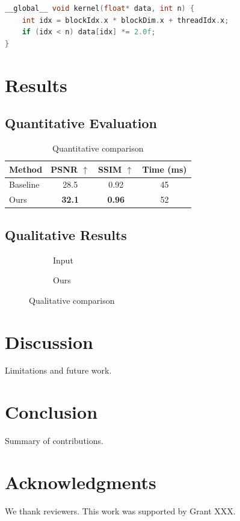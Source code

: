 \documentclass[sigconf,review,anonymous]{acmart}
\begin{document}
\begin{lstlisting}[language=C, caption=CUDA kernel, label=lst:cuda]
__global__ void kernel(float* data, int n) {
    int idx = blockIdx.x * blockDim.x + threadIdx.x;
    if (idx < n) data[idx] *= 2.0f;
}
\end{lstlisting}

\section{Results}
\label{sec:results}

\subsection{Quantitative Evaluation}
\label{sec:quantitative}

\begin{table}[htbp]
\caption{Quantitative comparison}\label{tab:quant}
\begin{tabular}{lccc}
\toprule
Method & PSNR $\uparrow$ & SSIM $\uparrow$ & Time (ms) \\
\midrule
Baseline & 28.5 & 0.92 & 45 \\
Ours & \textbf{32.1} & \textbf{0.96} & 52 \\
\bottomrule
\end{tabular}
\end{table}

\subsection{Qualitative Results}
\label{sec:qualitative}

\begin{figure}[htbp]
\centering
\begin{subfigure}[b]{0.48\linewidth}
\centering
\fbox{\parbox{4cm}{\centering [Input]}}
\caption{Input}\label{subfig:input}
\end{subfigure}
\hfill
\begin{subfigure}[b]{0.48\linewidth}
\centering
\fbox{\parbox{4cm}{\centering [Ours]}}
\caption{Ours}\label{subfig:ours}
\end{subfigure}
\caption{Qualitative comparison}\label{fig:qual}
\end{figure}

\section{Discussion}
\label{sec:discussion}

Limitations and future work.

\section{Conclusion}
\label{sec:conclusion}

Summary of contributions.

\section{Acknowledgments}
\label{sec:ack}

We thank reviewers. This work was supported by Grant XXX.



\end{document}
